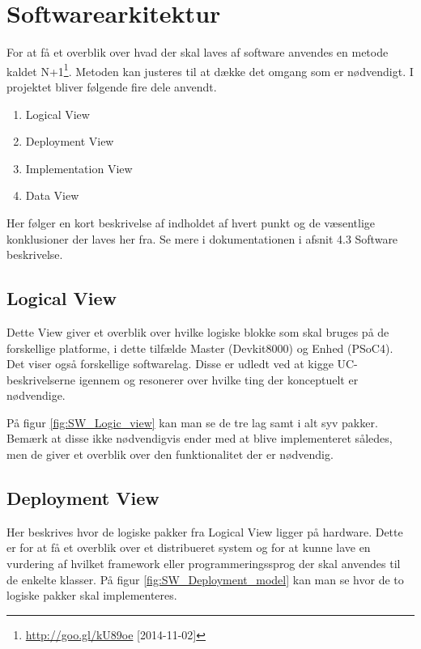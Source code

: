 \section{Softwarearkitektur}

For at få et overblik over hvad der skal laves af software anvendes en metode kaldet N+1\footnote{\url{http://goo.gl/kU89oe} [2014-11-02]}. Metoden kan justeres til at dække det omgang som er nødvendigt. I projektet bliver følgende fire dele anvendt.

\begin{enumerate}
	\item Logical View
	\item Deployment View
	\item Implementation View
	\item Data View
\end{enumerate}

Her følger en kort beskrivelse af indholdet af hvert punkt og de væsentlige konklusioner der laves her fra. Se mere i dokumentationen i afsnit 4.3 Software beskrivelse.

\subsection{Logical View}
Dette View giver et overblik over hvilke logiske blokke som skal bruges på de forskellige platforme, i dette tilfælde Master (Devkit8000) og Enhed (PSoC4). Det viser også forskellige softwarelag. Disse er udledt ved at kigge UC-beskrivelserne igennem og resonerer over hvilke ting der konceptuelt er nødvendige.

På figur \ref{fig:SW_Logic_view} kan man se de tre lag samt i alt syv pakker. Bemærk at disse ikke nødvendigvis ender med at blive implementeret således, men de giver et overblik over den funktionalitet der er nødvendig.


\subsection{Deployment View}
Her beskrives hvor de logiske pakker fra Logical View ligger på hardware. Dette er for at få et overblik over et distribueret system og for at kunne lave en vurdering af hvilket framework eller programmeringssprog der skal anvendes til de enkelte klasser. På figur \ref{fig:SW_Deployment_model} kan man se hvor de to logiske pakker skal implementeres.

